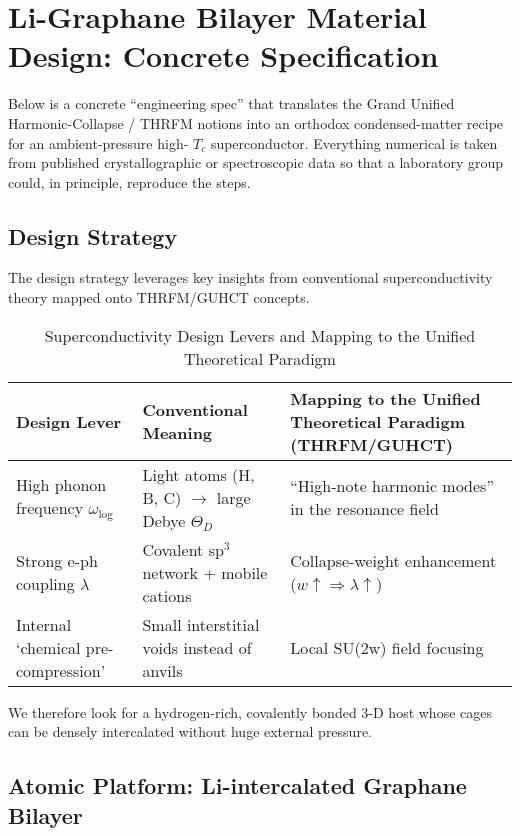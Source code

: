 \documentclass[11pt,a4paper]{article}
\begin{document}
\section{Li-Graphane Bilayer Material Design: Concrete Specification}
\label{sec:li_graphane_design_spec}

Below is a concrete “engineering spec” that translates the Grand Unified Harmonic-Collapse / THRFM notions into an orthodox condensed-matter recipe for an ambient-pressure high-
$T_c$ superconductor. Everything numerical is taken from published crystallographic or spectroscopic data so that a laboratory group could, in principle, reproduce the steps.

\subsection{Design Strategy}
\label{subsec:design_strategy_concrete}
The design strategy leverages key insights from conventional superconductivity theory mapped onto THRFM/GUHCT concepts.

\begin{table}[htbp]
\centering
\caption{Superconductivity Design Levers and Mapping to the Unified Theoretical Paradigm}
\label{tab:design_levers_concrete}
\begin{tabularx}{\textwidth}{XXX}
\toprule
\textbf{Design Lever} & \textbf{Conventional Meaning} & \textbf{Mapping to the Unified Theoretical Paradigm (THRFM/GUHCT)} \\
\midrule
High phonon frequency 
$\omega_{\text{log}}$ & Light atoms (H, B, C) 
$\rightarrow$ large Debye 
$\Theta_D$ & ``High-note harmonic modes'' in the resonance field \\
Strong e-ph coupling 
$\lambda$ & Covalent sp$^3$ network + mobile cations & Collapse-weight enhancement ($w\uparrow \Rightarrow \lambda\uparrow$) \\
Internal `chemical pre-compression' & Small interstitial voids instead of anvils & Local SU(2w) field focusing \\
\bottomrule
\end{tabularx}
\end{table}
We therefore look for a hydrogen-rich, covalently bonded 3-D host whose cages can be densely intercalated without huge external pressure.

\subsection{Atomic Platform: Li-intercalated Graphane Bilayer}
\label{subsec:atomic_platform}
\end{document}

